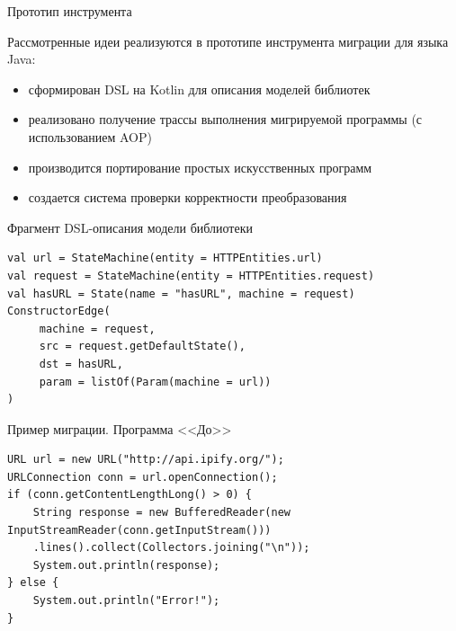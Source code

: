 \documentclass[12pt]{beamer}
\begin{document}
{
\begin{frame}{Прототип инструмента}
  \begin{mybox}[]
  Рассмотренные идеи реализуются в прототипе инструмента миграции для языка Java:
  \begin{itemize}
  	\item сформирован DSL на Kotlin для описания моделей библиотек
  	\item реализовано получение трассы выполнения мигрируемой программы (с использованием AOP)
  	\item производится портирование простых искусственных программ
  	\item создается система проверки корректности преобразования
  \end{itemize}
  \end{mybox}
\end{frame}
}

\begin{frame}[fragile]{Фрагмент DSL-описания модели библиотеки}
\begin{verbatim}
val url = StateMachine(entity = HTTPEntities.url)
val request = StateMachine(entity = HTTPEntities.request)
val hasURL = State(name = "hasURL", machine = request)
ConstructorEdge(
     machine = request,
     src = request.getDefaultState(),
     dst = hasURL,
     param = listOf(Param(machine = url))
)
\end{verbatim}
\end{frame}

\begin{frame}[fragile]{Пример миграции. Программа <<До>>}

\begin{verbatim}
URL url = new URL("http://api.ipify.org/");
URLConnection conn = url.openConnection();
if (conn.getContentLengthLong() > 0) {
    String response = new BufferedReader(new InputStreamReader(conn.getInputStream()))
    .lines().collect(Collectors.joining("\n"));
    System.out.println(response);
} else {
    System.out.println("Error!");
}
\end{verbatim}
\end{frame}
\end{document}
